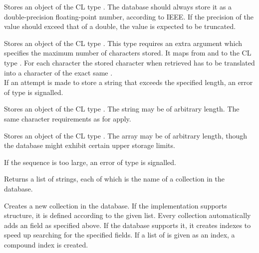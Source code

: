 Stores an object of the CL type . The database should always store it as a double-precision floating-point number, according to IEEE. If the precision of the value should exceed that of a double, the value is expected to be truncated.

Stores an object of the CL type . This type requires an extra argument which specifies the maximum number of characters stored. It maps from and to the CL type . For each character the stored character when retrieved has to be translated into a character of the exact same . \\

\noindent If an attempt is made to store a string that exceeds the specified length, an error of type  is signalled.

Stores an object of the CL type . The string may be of arbitrary length. The same character requirements as for  apply.

Stores an object of the CL type . The array may be of arbitrary length, though the database might exhibit certain upper storage limits.

\noindent If the sequence is too large, an error of type  is signalled.

Returns a list of strings, each of which is the name of a collection in the database.

Creates a new collection in the database. If the implementation supports structure, it is defined according to the given  list. Every collection automatically adds an  field as specified above. If the database supports it, it creates indexes to speed up searching for the specified fields. If a list of  is given as an index, a compound index is created. \\

